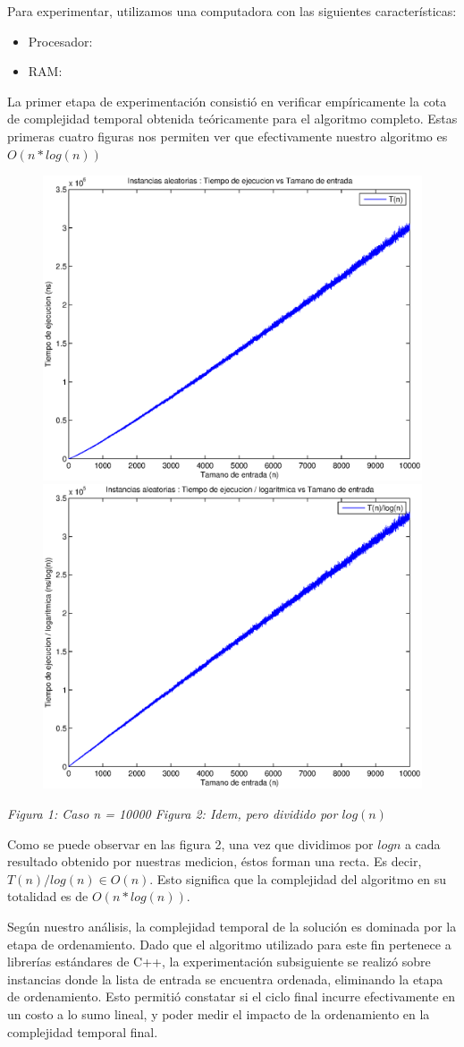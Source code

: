 Para experimentar, utilizamos una computadora con las siguientes características:

\begin{itemize}
 \item Procesador: 
 \item RAM: 
\end{itemize}

La primer etapa de experimentación consistió en verificar empíricamente la cota de complejidad temporal obtenida teóricamente para el algoritmo completo. Estas primeras cuatro figuras nos permiten ver que efectivamente nuestro algoritmo es $O(n * log(n))$

\begin{figure}[H]
    \includegraphics[width=0.5\linewidth]{problema1/graficos/problema1_aleatoria_10000.eps}
    \includegraphics[width=0.5\linewidth]{problema1/graficos/problema1_aleatoria_10000_div_logn.eps}
\end{figure}
\emph{\hspace{2,5cm}Figura 1: Caso n = 10000 \hspace{3cm}Figura 2: Idem, pero dividido por $log(n)$}

Como se puede observar en las figura 2, una vez que dividimos por $log n$ a cada resultado obtenido por nuestras medicion, éstos forman una recta. Es decir, $T(n)/log(n) \in O(n)$. Esto significa que la complejidad del algoritmo en su totalidad es de $O(n * log(n))$.

Según nuestro análisis, la complejidad temporal de la solución es dominada por la etapa de ordenamiento. Dado que el algoritmo utilizado para este fin pertenece a librerías estándares de C++, la experimentación subsiguiente se realizó sobre instancias donde la lista de entrada se encuentra ordenada, eliminando la etapa de ordenamiento. Esto permitió constatar si el ciclo final incurre efectivamente en un costo a lo sumo lineal, y poder medir el impacto de la ordenamiento en la complejidad temporal final.

